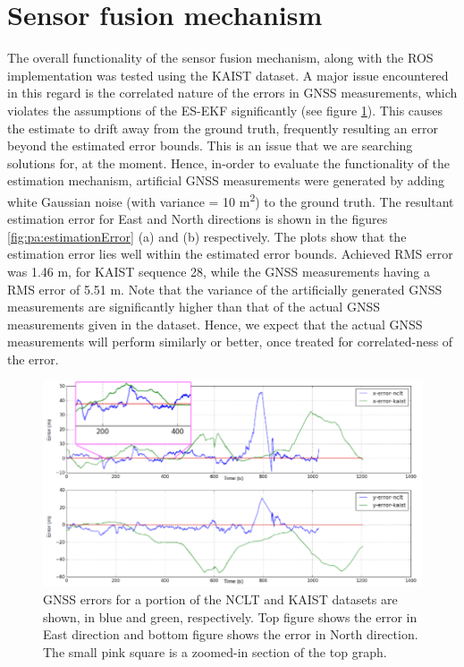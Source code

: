 \section{Sensor fusion mechanism}
The overall functionality of the sensor fusion mechanism, along with the \gls{ROS} implementation was tested using the \gls{KAIST} dataset. A major issue encountered in this regard is the correlated nature of the errors in \gls{GNSS} measurements, which violates the assumptions of the \gls{ES-EKF} significantly (see figure \ref{fig:pa:colouredGNSS}). This causes the estimate to drift away from the ground truth, frequently resulting an error beyond the estimated error bounds. This is an issue that we are searching solutions for, at the moment. Hence, in-order to evaluate the functionality of the estimation mechanism, artificial \gls{GNSS} measurements were generated by adding white Gaussian noise (with variance = 10 m\textsuperscript{2}) to the ground truth. The resultant estimation error for East and North directions is shown in the figures \ref{fig:pa:estimationError} (a) and (b) respectively. The plots show that the estimation error lies well within the estimated error bounds. Achieved \gls{RMS} error was 1.46 m, for \gls{KAIST} sequence 28, while the \gls{GNSS} measurements having a \gls{RMS} error of 5.51 m. Note that the variance of the artificially generated \gls{GNSS} measurements are significantly higher than that of the actual \gls{GNSS} measurements given in the dataset. Hence, we expect that the actual \gls{GNSS} measurements will perform similarly or better, once treated for correlated-ness of the error.
\begin{figure}[h]
	\centering
	\includegraphics[width=\textwidth]{figs/coloured_gnss.png}
	\vspace{-0.5cm}
	\caption[Nature of \gls{GNSS} errors]{\gls{GNSS} errors for a portion of the \gls{NCLT} and \gls{KAIST} datasets are shown, in blue and green, respectively. Top figure shows the error in East direction and bottom figure shows the error in North direction. The small pink square is a zoomed-in section of the top graph.}
	\label{fig:pa:colouredGNSS}
	\vspace{0.5cm}
\end{figure}
